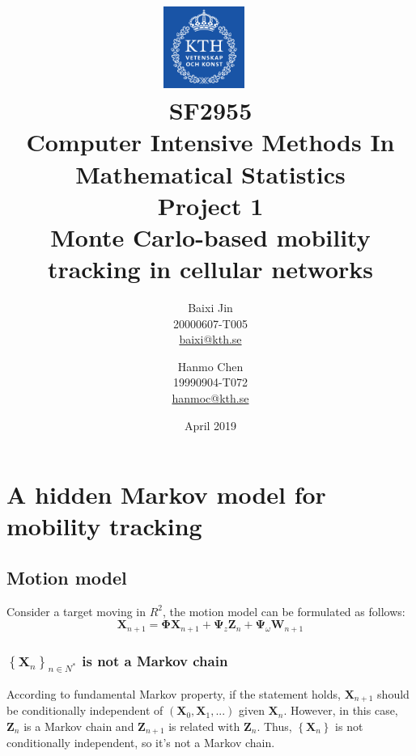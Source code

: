 \documentclass{article}
\begin{document}
\title{
\includegraphics[width=0.2\textwidth]{kthlogo.png}~ 
\\[1cm]
SF2955\\ Computer Intensive Methods In Mathematical Statistics \\Project 1 \\ \Sequential Monte Carlo-based mobility tracking in cellular networks}

\author{Baixi Jin \\ 20000607-T005 \\ \href{mailto:baixi@kth.se}{baixi@kth.se} \and Hanmo Chen \\19990904-T072 \\ \href{mailto:hanmoc@kth.se }{hanmoc@kth.se }}

\date{April 2019}

\maketitle 
\tableofcontents
\newpage


\section{A hidden Markov model for mobility tracking}

\subsection{Motion model}

Consider a target moving in $R^2$, the motion model can be formulated as follows:
\begin{equation}
    \boldsymbol{X}_{n+1}= \boldsymbol{\Phi}\boldsymbol{X}_{n+1}+\boldsymbol{\Psi}_z\boldsymbol{Z}_n+\boldsymbol{\Psi}_{\omega}\boldsymbol{W}_{n+1}
\end{equation}


\subsubsection{$\left\{\boldsymbol{X}_n\right\}_{n\in{N^*}}$ is not a Markov chain} 

According to fundamental Markov property, if the statement holds, $\boldsymbol{X}_{n+1}$ should be conditionally independent of $(\boldsymbol{X}_0,\boldsymbol{X}_1,...)$ given $\boldsymbol{X}_{n}$. However, in this case, ${\boldsymbol{Z}_n}$ is a Markov chain and $\boldsymbol{Z}_{n+1}$ is related with $\boldsymbol{Z}_n$. Thus, $\left\{\boldsymbol{X}_n\right\}$ is not conditionally independent, so it's not a Markov chain.
\end{document}
